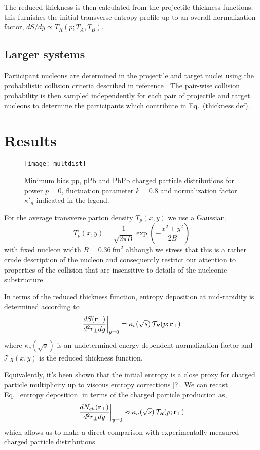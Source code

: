 \documentclass[aps,prl,reprint,amsmath,nofootinbib]{revtex4-1}
\begin{document}
The reduced thickness is then calculated from the projectile thickness functions; this furnishes the initial
transverse entropy profile up to an overall normalization factor, $dS/dy \propto T_R(p; T_A, T_B)$.

\subsection{Larger systems}

Participant nucleons are determined in the projectile and target nuclei using the probabilistic collision
criteria described in reference \cite{proton-proton}.  The pair-wise collision probability is then sampled
independently for each pair of projectile and target nucleons to determine the participants which contribute
in Eq.~(thickness def).


\section{Results}

\begin{figure*}[t]
  \texttt{[image: multdist]}
  \caption{\label{fig:multdist}Minimum bias pp, pPb and PbPb charged particle distributions for power $p=0$,
  fluctuation parameter $k=0.8$ and normalization factor $\kappa'_n$ indicated in the legend.}
\end{figure*}

For the average transverse parton density $T_p(x,y)$ we use a Gaussian,
\begin{equation}
  T_p(x,y) = \frac{1}{\sqrt{2 \pi B}} \exp\left(-\frac{x^2+y^2}{2 B}\right)
\end{equation}
with fixed nucleon width $B=0.36 ~\mathrm{fm}^2$ although we stress that this is a rather crude description of
the nucleon and consequently restrict our attention to properties of the collision that are insensitive to
details of the nucleonic substructure.

In terms of the reduced
thickness function, entropy deposition at mid-rapidity is determined according to
\begin{equation}
  \label{entropy deposition}
  \frac{dS({\bf r}_\perp)}{d^2r_\perp dy} \biggr \rvert_{y=0} = \kappa_s(\sqrt{s})\, \mathcal{T}_R(p;{\bf r}_\perp)
\end{equation}
where $\kappa_s(\sqrt{s})$ is an undetermined energy-dependent normalization factor and $\mathcal{T}_R(x,y)$
is the reduced thickness function.

Equivalently, it's been shown that the initial entropy is a close proxy for charged particle multiplicity up
to viscous entropy corrections [?]. We can recast Eq.~\eqref{entropy deposition} in terms of the charged
particle production as,
\begin{equation}
  \label{particle production}
  \frac{dN_{ch}({\bf r}_\perp)}{d^2r_\perp dy} \biggr \rvert_{y=0} \approx
  \kappa_n(\sqrt{s})\, \mathcal{T}_R(p;{\bf r}_\perp)
\end{equation}
which allows us to make a direct comparison with experimentally measured charged particle distributions.
\end{document}
